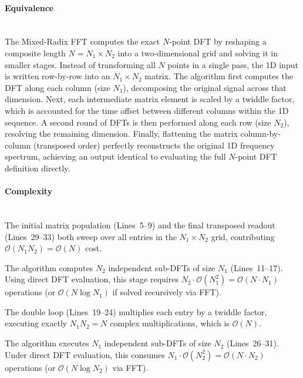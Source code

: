 \documentclass{article}
\begin{document}
\paragraph{Equivalence}~{} \\
The Mixed-Radix FFT computes the exact $N$-point DFT by reshaping a composite length $N = N_1 \times N_2$ into a two-dimensional grid and solving it in smaller stages. Instead of transforming all $N$ points in a single pass, the 1D input is written row-by-row into an $N_1 \times N_2$ matrix. The algorithm first computes the DFT along each column (size $N_1$), decomposing the original signal across that dimension. Next, each intermediate matrix element is scaled by a twiddle factor, which is accounted for the time offset between different columns within the 1D sequence. A second round of DFTs is then performed along each row (size $N_2$), resolving the remaining dimension. Finally, flattening the matrix column-by-column (transposed order) perfectly reconstructs the original 1D frequency spectrum, achieving an output identical to evaluating the full $N$-point DFT definition directly.

\paragraph{Complexity}~{}\\
The initial matrix population (Lines~5--9) and the final transposed readout (Lines~29--33) both sweep over all entries in the $N_1 \times N_2$ grid, contributing $\mathcal{O}(N_1 N_2) = \mathcal{O}(N)$ cost. 

The algorithm computes $N_2$ independent sub-DFTs of size $N_1$ (Lines~11--17). Using direct DFT evaluation, this stage requires $N_2 \cdot \mathcal{O}(N_1^2) = \mathcal{O}(N \cdot N_1)$ operations (or $\mathcal{O}(N \log N_1)$ if solved recursively via FFT).

The double loop (Lines~19--24) multiplies each entry by a twiddle factor, executing exactly $N_1 N_2 = N$ complex multiplications, which is $\mathcal{O}(N)$.

The algorithm executes $N_1$ independent sub-DFTs of size $N_2$ (Lines~26--31). Under direct DFT evaluation, this consumes $N_1 \cdot \mathcal{O}(N_2^2) = \mathcal{O}(N \cdot N_2)$ operations (or $\mathcal{O}(N \log N_2)$ via FFT).
\end{document}
